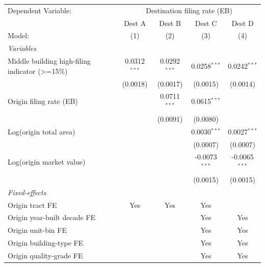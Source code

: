 \begingroup
\centering
\begin{tabular}{lcccc}
   \tabularnewline \midrule \midrule
   Dependent Variable: & \multicolumn{4}{c}{Destination filing rate (EB)}\\
                                                   & Dest A         & Dest B         & Dest C          & Dest D \\   
   Model:                                          & (1)            & (2)            & (3)             & (4)\\  
   \midrule
   \emph{Variables}\\
   Middle building high-filing indicator (>=15\%)  & 0.0312$^{***}$ & 0.0292$^{***}$ & 0.0258$^{***}$  & 0.0242$^{***}$\\   
                                                   & (0.0018)       & (0.0017)       & (0.0015)        & (0.0014)\\   
   Origin filing rate (EB)                         &                & 0.0711$^{***}$ & 0.0615$^{***}$  &   \\   
                                                   &                & (0.0091)       & (0.0080)        &   \\   
   Log(origin total area)                          &                &                & 0.0030$^{***}$  & 0.0027$^{***}$\\   
                                                   &                &                & (0.0007)        & (0.0007)\\   
   Log(origin market value)                        &                &                & -0.0073$^{***}$ & -0.0065$^{***}$\\   
                                                   &                &                & (0.0015)        & (0.0015)\\   
   \midrule
   \emph{Fixed-effects}\\
   Origin tract FE                                 & Yes            & Yes            & Yes             & \\  
   Origin year-built decade FE                     &                &                & Yes             & Yes\\  
   Origin unit-bin FE                              &                &                & Yes             & Yes\\  
   Origin building-type FE                         &                &                & Yes             & Yes\\  
   Origin quality-grade FE                         &                &                & Yes             & Yes\\  

\end{tabular}
